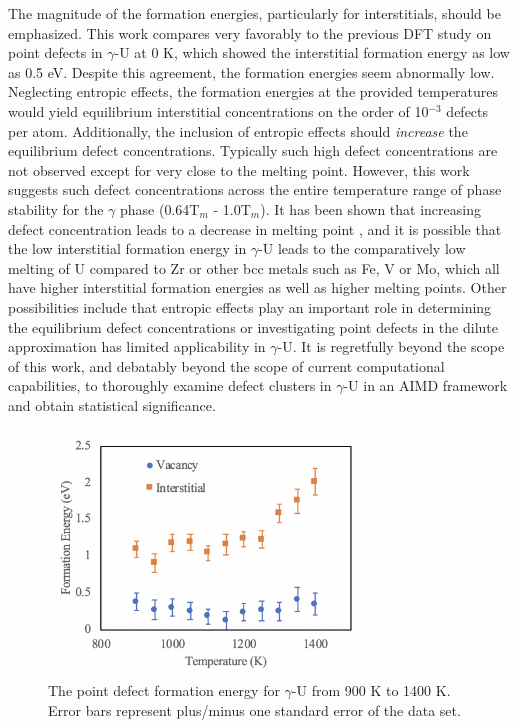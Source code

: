 \documentclass[review]{elsarticle}
\begin{document}
The magnitude of the formation energies, particularly for interstitials, should be emphasized. This work compares very favorably to the previous DFT study on point defects in $\gamma$-U at 0 K\cite{beeler2010}, which showed the interstitial formation energy as low as 0.5 eV. Despite this agreement, the formation energies seem abnormally low.  Neglecting entropic effects, the formation energies at the provided temperatures would yield equilibrium interstitial concentrations on the order of 10$^{-3}$ defects per atom. Additionally, the inclusion of entropic effects should \textit{increase} the equilibrium defect concentrations. Typically such high defect concentrations are not observed except for very close to the melting point. However, this work suggests such defect concentrations across the entire temperature range of phase stability for the $\gamma$ phase (0.64T$_m$ - 1.0T$_m$). It has been shown that increasing defect concentration leads to a decrease in melting point \cite{sorkin2003}, and it is possible that the low interstitial formation energy in $\gamma$-U leads to the comparatively low melting of U compared to Zr or other bcc metals \cite{williams1990} such as Fe, V or Mo, which all have higher interstitial formation energies \cite{mendelev2010, mendelev2009, nguyen2006} as well as higher melting points. Other possibilities include that entropic effects play an important role in determining the equilibrium defect concentrations or investigating point defects in the dilute approximation has limited applicability in $\gamma$-U. It is regretfully beyond the scope of this work, and debatably beyond the scope of current computational capabilities, to thoroughly examine defect clusters in $\gamma$-U in an AIMD framework and obtain statistical significance. 

 \begin{figure}[h]
 \centering
 \includegraphics[width=0.75\textwidth]{5_eform.png} 
 \caption{The point defect formation energy for $\gamma$-U from 900 K to 1400 K. Error bars represent plus/minus one standard error of the data set. }
 \label{fig:eform}
\end{figure}
\end{document}

